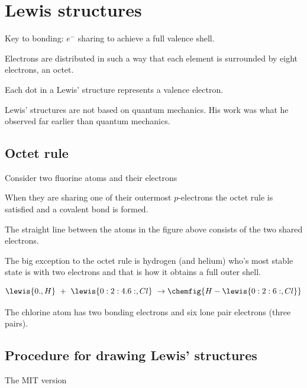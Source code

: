 \documentclass[../mit-general-chemistry.tex]{subfiles}
\begin{document}
\section{Lewis structures}

Key to bonding: $e^-$ sharing to achieve a full valence shell.

Electrons are distributed in such a way that each element is
surrounded by eight electrons, an octet.

Each dot in a Lewis' structure represents a valence electron.

Lewis' structures are not based on quantum mechanics. His work was
what he observed far earlier than quantum mechanics.


\subsection{Octet rule}

Consider two fluorine atoms and their electrons

\hspace*{\fill}
\hfill
{}
\hspace*{\fill}

When they are sharing one of their outermost $p$-electrons the octet
rule is satisfied and a covalent bond is formed.

\begin{center}
\end{center}

The straight line between the atoms in the figure above consists of the
two shared electrons.


The big exception to the octet rule is hydrogen (and helium) who's
most stable state is with two electrons and that is how it obtains a
full outer shell.

\begin{equation*}
  \lewis{0., H}\ +\ \lewis{0:2:4.6:, Cl} \ \rightarrow \chemfig{H-\lewis{0:2:6:, Cl}}
\end{equation*}

The chlorine atom has two bonding electrons and six lone pair
electrons (three pairs).


\subsection{Procedure for drawing Lewis' structures}


The MIT version
\end{document}
